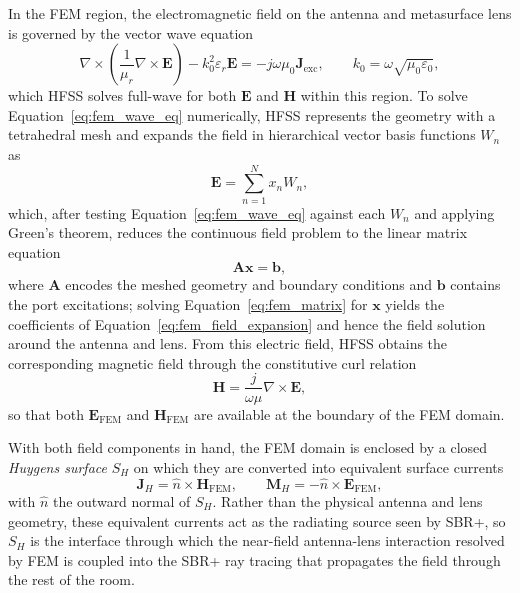 In the FEM region, the electromagnetic field on the antenna and metasurface lens is governed by the vector wave equation
\begin{equation}
    \nabla\times\left(\frac{1}{\mu_r}\nabla\times\mathbf{E}\right) - k_0^2\varepsilon_r\mathbf{E} = -j\omega\mu_0\mathbf{J}_{\text{exc}},
    \qquad k_0=\omega\sqrt{\mu_0\varepsilon_0},
    \label{eq:fem_wave_eq}
\end{equation}
which HFSS solves full-wave for both $\mathbf{E}$ and $\mathbf{H}$ within this region. To solve Equation~\ref{eq:fem_wave_eq} numerically, HFSS represents the geometry with a tetrahedral mesh and expands the field in hierarchical vector basis functions $W_n$ as
\begin{equation}
    \mathbf{E} = \sum_{n=1}^{N} x_n W_n,
    \label{eq:fem_field_expansion}
\end{equation}
which, after testing Equation~\ref{eq:fem_wave_eq} against each $W_n$ and applying Green's theorem, reduces the continuous field problem to the linear matrix equation
\begin{equation}
    \mathbf{A}\mathbf{x} = \mathbf{b},
    \label{eq:fem_matrix}
\end{equation}
where $\mathbf{A}$ encodes the meshed geometry and boundary conditions and $\mathbf{b}$ contains the port excitations; solving Equation~\ref{eq:fem_matrix} for $\mathbf{x}$ yields the coefficients of Equation~\ref{eq:fem_field_expansion} and hence the field solution around the antenna and lens. From this electric field, HFSS obtains the corresponding magnetic field through the constitutive curl relation
\begin{equation}
    \mathbf{H} = \frac{j}{\omega\mu}\nabla\times\mathbf{E},
    \label{eq:fem_h_field}
\end{equation}
so that both $\mathbf{E}_{\text{FEM}}$ and $\mathbf{H}_{\text{FEM}}$ are available at the boundary of the FEM domain.

With both field components in hand, the FEM domain is enclosed by a closed \emph{Huygens surface} $S_H$ on which they are converted into equivalent surface currents
\begin{equation}
    \mathbf{J}_H = \hat{n}\times\mathbf{H}_{\text{FEM}}, \qquad \mathbf{M}_H = -\hat{n}\times\mathbf{E}_{\text{FEM}},
    \label{eq:huygens_currents}
\end{equation}
with $\hat{n}$ the outward normal of $S_H$. Rather than the physical antenna and lens geometry, these equivalent currents act as the radiating source seen by SBR+, so $S_H$ is the interface through which the near-field antenna-lens interaction resolved by FEM is coupled into the SBR+ ray tracing that propagates the field through the rest of the room.


